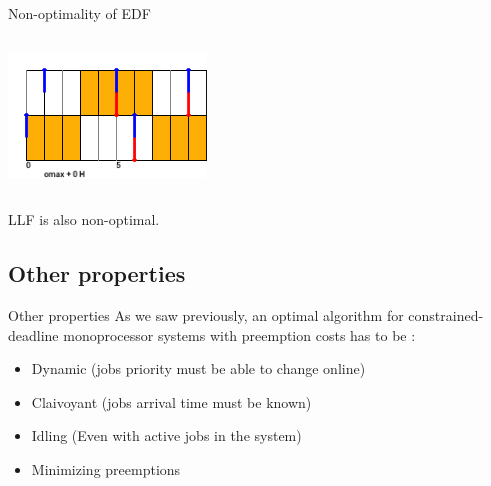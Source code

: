 \documentclass{beamer}
\begin{document}
\begin{frame}{Non-optimality of EDF}
\begin{columns}[c]
        \includegraphics[width=0.9\textwidth]{figs/edfNonOptimal_PALLF.png}
    \end{columns}

    LLF is also non-optimal.
\end{frame}

\subsection{Other properties}

\begin{frame}{Other properties}
    As we saw previously, an optimal algorithm for constrained-deadline monoprocessor systems with preemption costs has to be :
    \begin{itemize}
        \item Dynamic (jobs priority must be able to change online)
        \item Claivoyant (jobs arrival time must be known)
        \item Idling (Even with active jobs in the system)
        \item Minimizing preemptions
    \end{itemize}

\end{frame}
\end{document}
